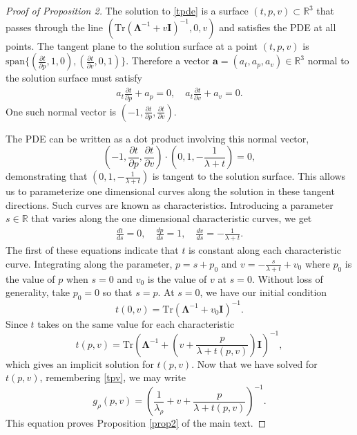 \documentclass{article}
\begin{document}
\begin{proof}[Proof of Proposition 2]
The solution to \eqref{tpde} is a surface $(t,p,v) \subset \mathbb{R}^{3}$ that passes through the line $(\text{Tr}( \mathbf{\Lambda}^{-1} + v \mathbf{I})^{-1}, 0, v)$ and satisfies the PDE at all points.
The tangent plane to the solution surface at a point $(t,p,v)$ is $\text{span}\{ (\frac{\partial t}{\partial p}, 1, 0),( \frac{\partial t}{\partial v}, 0, 1) \}$. Therefore a vector $\mathbf{a} = (a_t, a_p, a_v) \in \mathbb{R}^3$ normal to the solution surface must satisfy
\begin{align}
    \nonumber
    a_t \frac{\partial t}{\partial p} + a_p = 0,\quad 
    a_t \frac{\partial t}{\partial v} + a_v = 0.
\end{align}
%
One such normal vector is $(-1,\frac{\partial t}{\partial p}, \frac{\partial t}{\partial v})$.

The PDE can be written as a dot product involving this normal vector,
\begin{equation}
    \left(-1,\frac{\partial t}{\partial p}, \frac{\partial t}{\partial v} \right) \cdot \left (0, 1, - \frac{1}{\lambda+t} \right) = 0,
\end{equation}
%
demonstrating that $(0, 1, - \frac{1}{\lambda+t} )$ is tangent to the solution surface. This allows us to parameterize one dimensional curves along the solution in these tangent directions. Such curves are known as characteristics. Introducing a parameter $s \in \mathbb{R}$ that varies along the one dimensional characteristic curves, we get
\begin{align}
    \frac{d t}{d s} = 0,\quad
    \frac{d p}{d s} = 1, \quad
    \frac{d v}{d s} = - \frac{1}{\lambda + t}.
\end{align}
%
The first of these equations indicate that $t$ is constant along each characteristic curve. Integrating along the parameter, $p = s + p_0$ and $v = - \frac{s}{\lambda+t} + v_0$ where $p_0$ is the value of $p$ when $s=0$ and $v_0$ is the value of $v$ at $s=0$. Without loss of generality, take $p_0 = 0$ so that $s=p$. At $s=0$, we have our initial condition
%
\begin{equation}
    t(0,v) = \text{Tr} \left( \mathbf{\Lambda}^{-1} + v_0 \mathbf{I} \right)^{-1}.
\end{equation}
%
Since $t$ takes on the same value for each characteristic
\begin{equation}\label{timplicit}
    t(p,v) = \text{Tr} \left( \mathbf{\Lambda}^{-1} + \left(v + \frac{p}{\lambda+t(p,v)} \right) \mathbf{I} \right)^{-1},
\end{equation}
which gives an implicit solution for $t(p,v)$. 
Now that we have solved for $t(p,v)$, remembering \eqref{tpv}, we may write
\begin{equation}
    g_\rho(p,v) = \left(\frac{1}{\lambda_\rho} + v + \frac{p}{\lambda + t(p,v)}\right)^{-1}.
\end{equation}
%
This equation proves Proposition \ref{prop2} of the main text.
\end{proof}
\end{document}
